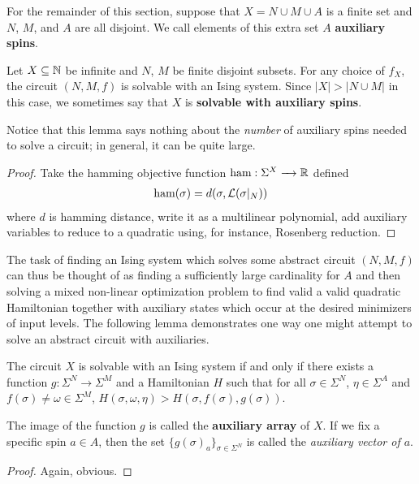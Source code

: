 \documentclass{article}
\begin{document}
For the remainder of this section, suppose that $X = N \cup M \cup A$ is a finite set and $N$, $M$, and $A$ are all disjoint. We call elements of this extra set $A$ \textbf{auxiliary spins}.

\begin{prop}\label{prop:all-circuits-solvable-with-auxiliaries}
  Let $X \subseteq \mathbb{N}$ be infinite and $N$, $M$ be finite disjoint subsets. For any choice of $f_X$, the circuit $(N, M, f)$ is solvable with an Ising system. Since $|X| > |N\cup M|$ in this case, we sometimes say that $X$ is \textbf{solvable with auxiliary spins}.
\end{prop}
Notice that this lemma says nothing about the \emph{number} of auxiliary spins needed to solve a circuit; in general, it can be quite large.
\begin{proof}
  Take the hamming objective function $\text{ham}:\Sigma^X \to \bR$ defined
  \begin{align*}
    \text{ham}(\sigma) = d(\sigma, \mathcal{L}(\sigma|_N))
  \end{align*}
  where $d$ is hamming distance, write it as a multilinear polynomial, add auxiliary variables to reduce to a quadratic using, for instance, Rosenberg reduction.
\end{proof}

The task of finding an Ising system which solves some abstract circuit $(N, M, f)$ can thus be thought of as finding a sufficiently large cardinality for $A$ and then solving a mixed non-linear optimization problem to find valid a valid quadratic Hamiltonian together with auxiliary states which occur at the desired minimizers of input levels. The following lemma demonstrates one way one might attempt to solve an abstract circuit with auxiliaries. 

\begin{lem}\label{lem:weak-constraints}
  The circuit $X$ is solvable with an Ising system if and only if there exists a function $g:\Sigma^N \to \Sigma^M$ and a Hamiltonian $H$ such that for all $\sigma \in \Sigma^N$, $\eta \in \Sigma^A$ and $f(\sigma) \neq \omega \in \Sigma^M$, $H(\sigma, \omega, \eta) > H(\sigma, f(\sigma), g(\sigma))$.
\end{lem}
The image of the function $g$ is called the \textbf{auxiliary array} of $X$. If we fix a specific spin $a \in A$, then the set $\{g(\sigma)_a\}_{\sigma \in \Sigma^N}$ is called the \emph{auxiliary vector of $a$}.
\begin{proof}
  Again, obvious.
\end{proof}
\end{document}
